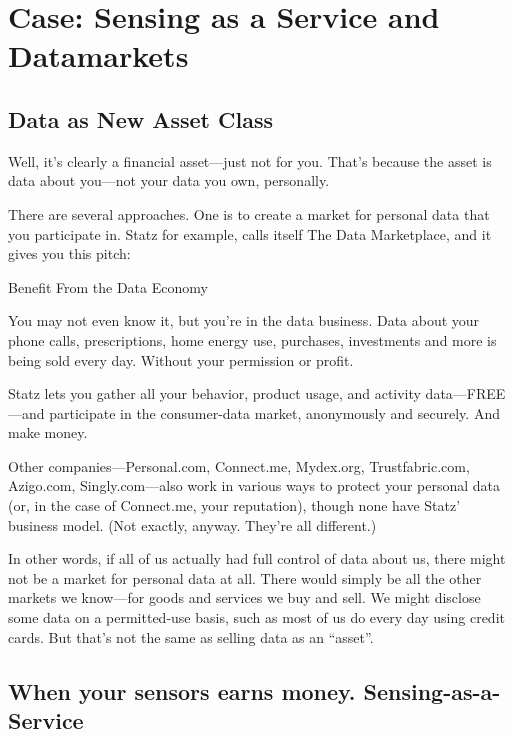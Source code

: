\chapter{Case: Sensing as a Service and Datamarkets}
\label{sec:datamarket}

\section{Data as New Asset Class}

Well, it's clearly a financial asset—just not for you. That's because the asset is data about you—not your data you own, personally.

There are several approaches. One is to create a market for personal data that you participate in. Statz  for example, calls itself The Data Marketplace, and it gives you this pitch:

Benefit From the Data Economy

You may not even know it, but you're in the data business. Data about your phone calls, prescriptions, home energy use, purchases, investments and more is being sold every day. Without your permission or profit.

Statz lets you gather all your behavior, product usage, and activity data—FREE—and participate in the consumer-data market, anonymously and securely. And make money.

Other companies—Personal.com, Connect.me, Mydex.org, Trustfabric.com, Azigo.com, Singly.com—also work in various ways to protect your personal data (or, in the case of Connect.me, your reputation), though none have Statz' business model. (Not exactly, anyway. They're all different.)

In other words, if all of us actually had full control of data about us, there might not be a market for personal data at all. There would simply be all the other markets we know—for goods and services we buy and sell. We might disclose some data on a permitted-use basis, such as most of us do every day using credit cards. But that's not the same as selling data as an “asset”.

\cite{Searls:2012:EPD:2132860.2132869}


\section{When your sensors earns money. Sensing-as-a-Service}

